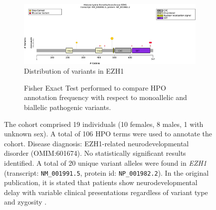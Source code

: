 \begin{figure}[htbp]
\centering
\begin{subfigure}[b]{0.95\textwidth}
\centering
\includegraphics[width=\textwidth]{ img/EZH1_protein_diagram.pdf} 
\captionsetup{justification=raggedright,singlelinecheck=false}
\caption{Distribution of variants in EZH1}
\end{subfigure}

\vspace{2em}

\begin{subfigure}[b]{0.95\textwidth}
\centering
{}
\captionsetup{justification=raggedright,singlelinecheck=false}
\caption{Fisher Exact Test performed to compare HPO annotation frequency with respect to monoallelic and biallelic pathogenic variants. }
\end{subfigure}

\vspace{2em}

\caption{The cohort comprised 19 individuals (10 females, 8 males, 1 with unknown sex). A total of 106 HPO terms were used to annotate the cohort. Disease diagnosis: EZH1-related neurodevelopmental disorder (OMIM:601674). No statistically significant results identified. A total of 20 unique variant alleles were found in \textit{EZH1} (transcript: \texttt{NM\_001991.5}, protein id: \texttt{NP\_001982.2}). In the original publication, it is stated that patients show neurodevelopmental delay with variable clinical presentations regardless of variant type and zygosity \cite{PMID_37433783}.}
\end{figure}
